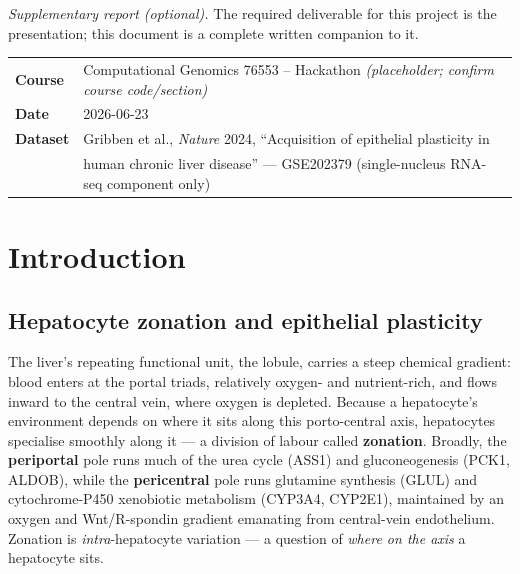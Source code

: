 \documentclass[11pt,a4paper]{article}
\begin{document}
\setcounter{tocdepth}{2}
\begingroup\renewcommand{\contentsname}{\normalsize Contents}{\small\tableofcontents}\endgroup
\vspace{0.6em}

\noindent\textit{Supplementary report (optional).} The required deliverable for this project is the presentation; this document is a complete written companion to it.

\vspace{0.4em}
\begin{table}[h]
\centering\small
\begin{tabular}{ll}
\toprule
\textbf{Course} & Computational Genomics 76553 -- Hackathon \emph{(placeholder; confirm course code/section)} \\
\textbf{Date} & 2026-06-23 \\
\textbf{Dataset} & Gribben et al., \emph{Nature} 2024, ``Acquisition of epithelial plasticity in \\
 & human chronic liver disease'' --- GSE202379 (single-nucleus RNA-seq component only) \\
\bottomrule
\end{tabular}
\end{table}

\section{Introduction}

\subsection{Hepatocyte zonation and epithelial plasticity}

The liver's repeating functional unit, the lobule, carries a steep chemical gradient: blood enters at the portal triads, relatively oxygen- and nutrient-rich, and flows inward to the central vein, where oxygen is depleted. Because a hepatocyte's environment depends on where it sits along this porto-central axis, hepatocytes specialise smoothly along it --- a division of labour called \textbf{zonation}. Broadly, the \textbf{periportal} pole runs much of the urea cycle (ASS1) and gluconeogenesis (PCK1, ALDOB), while the \textbf{pericentral} pole runs glutamine synthesis (GLUL) and cytochrome-P450 xenobiotic metabolism (CYP3A4, CYP2E1), maintained by an oxygen and Wnt/R-spondin gradient emanating from central-vein endothelium. Zonation is \emph{intra}-hepatocyte variation --- a question of \emph{where on the axis} a hepatocyte sits.
\end{document}
